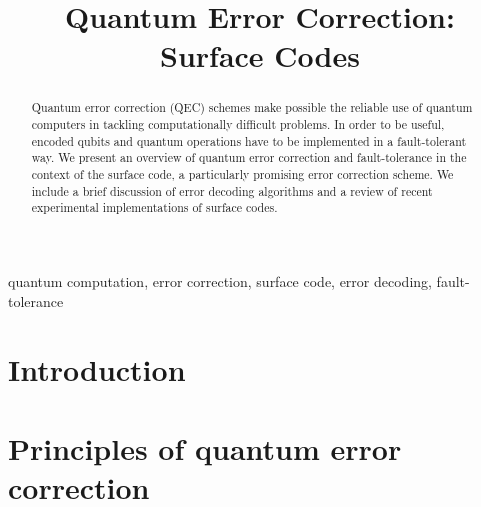 \documentclass[conference]{IEEEtran}
\begin{document}
\title{Quantum Error Correction: Surface Codes}

\author{

  \and

}

\maketitle


\begin{abstract}
  Quantum error correction (QEC) schemes make possible the reliable use of
  quantum computers in tackling computationally difficult problems. In order to
  be useful, encoded qubits and quantum operations have to be implemented in a
  fault-tolerant way. We present an overview of quantum error correction and
  fault-tolerance in the context of the surface code, a particularly promising
  error correction scheme. We include a brief discussion of error decoding
  algorithms and a review of recent experimental implementations of surface
  codes.
\end{abstract}

\begin{IEEEkeywords}
  quantum computation, error correction, surface code, error decoding,
  fault-tolerance
\end{IEEEkeywords}

\section{Introduction}


\section{Principles of quantum error correction}

\end{document}
